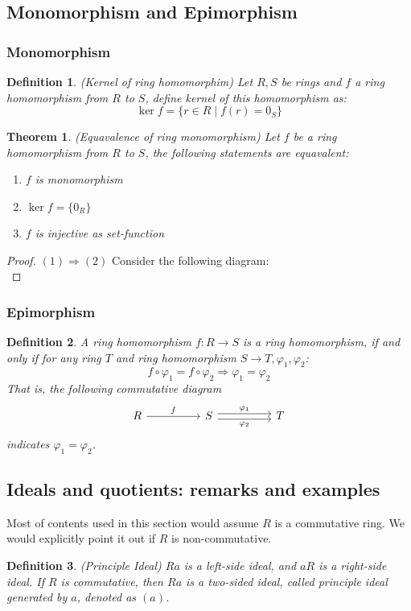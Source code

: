 \documentclass[a4paper, pdf, 11.5pt]{article}
\newtheorem{definition}{Definition}
\newtheorem{theorem}{Theorem}
\begin{document}
\subsection{Monomorphism and Epimorphism}
\subsubsection{Monomorphism}
\begin{definition}(Kernel of ring homomorphim)
Let $R, S$ be rings and $f$ a ring homomorphism from $R$ to $S$, define kernel of this homomorphism as:
$$
\ker f=\{r\in R\mid f(r) = 0_{S}\}
$$
\end{definition}
\vspace{0.3cm}
\begin{theorem}(Equavalence of ring monomorphism)
Let $f$ be a ring homomorphism from $R$ to $S$, the following statements are equavalent: 
\begin{enumerate}
  \item  $f$ is monomorphism 
  \item  $\ker f=\{0_{R}\}$
  \item  $f$ is injective as set-function
\end{enumerate}
\end{theorem}
\begin{proof}
  $(1)\Rightarrow(2)$ Consider the following diagram:
  $$
  $$
  
\end{proof}
\subsubsection{Epimorphism}
\vspace{0.3cm}
\begin{definition}
A ring homomorphism $f:R\rightarrow S$ is a ring homomorphism, if and only if for any ring $T$ and ring homomorphism $S\rightarrow T, \varphi_1, \varphi_2$:
$$
f\circ \varphi_1 = f\circ \varphi_2\Longrightarrow \varphi_1 = \varphi_2 
$$
That is, the following commutative diagram
$$
\begin{tikzcd}[column sep=huge]
  R \arrow[r, "f"] & S \arrow[r, "\varphi_1", shift left] \arrow[r, "\varphi_2"', shift right] & T
\end{tikzcd}
$$
indicates $\varphi_1 = \varphi_2$. 
\end{definition}

\subsection{Ideals and quotients: remarks and examples}
Most of contents used in this section would assume $R$ is a commutative ring. We would explicitly 
point it out if $R$ is non-commutative.
\begin{definition}(Principle Ideal)
  $Ra$ is a left-side ideal, and $aR$ is a right-side ideal. If $R$ is commutative, then $Ra$ 
  is a two-sided ideal, called principle ideal generated by $a$, denoted as $(a)$.
\end{definition}
\end{document}
